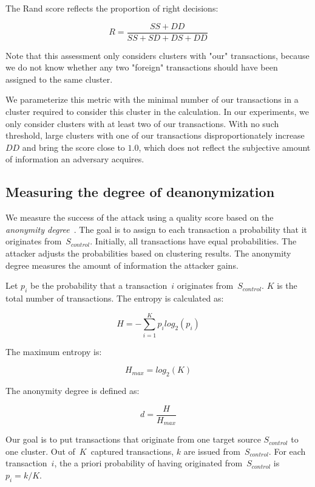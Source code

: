 The Rand score reflects the proportion of right decisions:

\[
R = \frac{SS + DD}{SS + SD + DS + DD}
\]

Note that this assessment only considers clusters with "our" transactions, because we do not know whether any two "foreign" transactions should have been assigned to the same cluster.

We parameterize this metric with the minimal number of our transactions in a cluster required to consider this cluster in the calculation.
In our experiments, we only consider clusters with at least two of our transactions.
With no such threshold, large clusters with one of our transactions disproportionately increase $DD$ and bring the score close to $1.0$, which does not reflect the subjective amount of information an adversary acquires.


\subsection{Measuring the degree of deanonymization}

We measure the success of the attack using a quality score based on the \textit{anonymity degree}~\cite{Diaz2002}.
The goal is to assign to each transaction a probability that it originates from~$S_{control}$.
Initially, all transactions have equal probabilities.
The attacker adjusts the probabilities based on clustering results.
The anonymity degree measures the amount of information the attacker gains.

Let $p_i$ be the probability that a transaction~$i$ originates from~$S_{control}$.
$K$ is the total number of transactions.
The entropy is calculated as:

\[
H = -\sum_{i=1}^K p_i log_2(p_i)
\]

The maximum entropy is:

\[
H_{max} = log_2(K)
\]

The anonymity degree is defined as:

\[
d = \frac{H}{H_{max}}
\]

Our goal is to put transactions that originate from one target source $S_{control}$ to one cluster.
Out of~$K$~captured transactions, $k$ are issued from~$S_{control}$.
For each transaction~$i$, the a priori probability of having originated from~$S_{control}$ is $p_i = k / K$.

